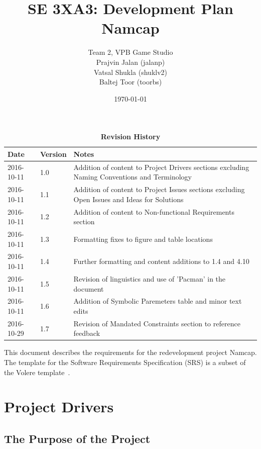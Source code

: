 \documentclass[12pt, titlepage]{article}
\title{SE 3XA3: Development Plan\\Namcap}
\author{Team 2, VPB Game Studio
		\\ Prajvin Jalan (jalanp)
		\\ Vatsal Shukla (shuklv2)
		\\ Baltej Toor (toorbs)
}
\date{\today}
\begin{document}
\maketitle

\tableofcontents
\listoftables
\listoffigures

\newpage

\begin{table}[H]
\caption{\bf Revision History}
\begin{tabularx}{\textwidth}{p{3cm}p{2cm}X}
\toprule {\bf Date} & {\bf Version} & {\bf Notes}\\
\midrule
2016-10-11 & 1.0 & Addition of content to Project Drivers sections excluding Naming Conventions and Terminology\\
2016-10-11 & 1.1 & Addition of content to Project Issues sections excluding Open Issues and Ideas for Solutions\\
2016-10-11 & 1.2 & Addition of content to Non-functional Requirements section\\
2016-10-11 & 1.3 & Formatting fixes to figure and table locations\\
2016-10-11 & 1.4 & Further formatting and content additions to 1.4 and 4.10\\
2016-10-11 & 1.5 & Revision of linguistics and use of 'Pacman' in the document\\
2016-10-11 & 1.6 & Addition of Symbolic Paremeters table and minor text edits\\
2016-10-29 & 1.7 & Revision of Mandated Constraints section to reference feedback\\
\bottomrule
\end{tabularx}
\end{table}

\newpage


This document describes the requirements for the redevelopment project Namcap.  The template for the Software
Requirements Specification (SRS) is a subset of the Volere
template~\citep{RobertsonAndRobertson2012}.

\section{Project Drivers}

\subsection{The Purpose of the Project}
\end{document}
